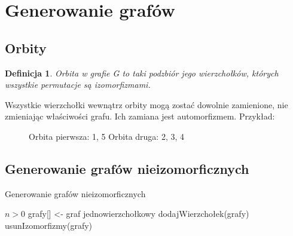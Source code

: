 \documentclass[11pt]{article}
\newtheorem{definition}{Definicja}[section]
\begin{document}
  
\section{Generowanie grafów}
\subsection{Orbity}
\begin{definition}
  Orbita w grafie G to taki podzbiór jego wierzchołków, których wszystkie permutacje są izomorfizmami. 
\end{definition}

Wszystkie wierzchołki wewnątrz orbity mogą zostać dowolnie zamienione, nie zmieniając właściwości grafu. Ich zamiana jest automorfizmem.
Przykład: 
\begin{figure}[h]
  \centering
    \caption{Orbita pierwsza: 1, 5 
    Orbita druga: 2, 3, 4}
 \end{figure}
 

\subsection{Generowanie grafów nieizomorficznych} 

\begin{algorithm}
  \caption{Generowanie grafów nieizomorficznych}
  \begin{algorithmic}
  \REQUIRE $n > 0 $
  \STATE grafy[] <- graf jednowierzchołkowy 
    \STATE dodajWierzchołek(grafy)
    \STATE usunIzomorfizmy(grafy)
  \ENDWHILE
  \end{algorithmic}
\end{algorithm}
\end{document}
